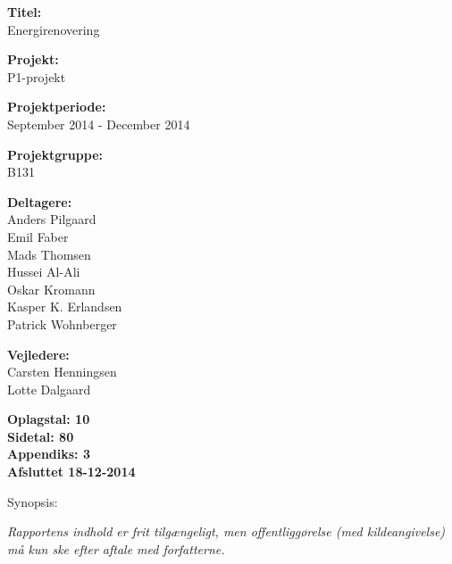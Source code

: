\begin{minipage}[t]{0.48\textwidth}
\textbf{Titel:} \\[5pt]\bigskip\hspace{2ex}
Energirenovering

\textbf{Projekt:} \\[5pt]\bigskip\hspace{2ex}
P1-projekt

\textbf{Projektperiode:} \\[5pt]\bigskip\hspace{2ex}
September 2014 - December 2014

\textbf{Projektgruppe:} \\[5pt]\bigskip\hspace{2ex}
B131	

\textbf{Deltagere:} \\[5pt]\hspace*{2ex}
Anders Pilgaard \\\hspace*{2ex}
Emil Faber \\\hspace*{2ex}
Mads Thomsen \\\hspace*{2ex}
Hussei Al-Ali \\\hspace*{2ex}
Oskar Kromann \\\hspace*{2ex}
Kasper K. Erlandsen \\\bigskip\hspace{2ex}
Patrick Wohnberger

\textbf{Vejledere:} \\[5pt]\hspace*{2ex}
Carsten Henningsen \\\bigskip\hspace{2ex}
Lotte Dalgaard

\vspace*{1cm}

\textbf{Oplagstal: 10} \\
\textbf{Sidetal: 80} \\
\textbf{Appendiks: 3} \\ 
\textbf{Afsluttet 18-12-2014}

\end{minipage}
\hfill
\begin{minipage}[t]{0.483\textwidth}
Synopsis: \\[5pt]
\fbox{\parbox{7cm}{\bigskip\bigskip}}
\end{minipage}

\vfill

{\footnotesize\itshape Rapportens indhold er frit tilgængeligt, men offentliggørelse (med kildeangivelse) må kun ske efter aftale med forfatterne.}


